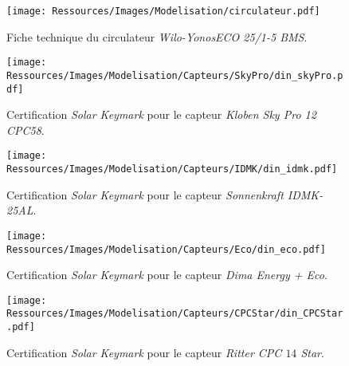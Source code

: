 
\begin{figure}
    \centering
    \texttt{[image: Ressources/Images/Modelisation/circulateur.pdf]}
    \caption{Fiche technique du circulateur \textit{Wilo-YonosECO 25/1-5 BMS}.
             \label{fig:caracs_pompes}}
\end{figure}


\begin{figure}
    \centering
    \texttt{[image: Ressources/Images/Modelisation/Capteurs/SkyPro/din\_skyPro.pdf]}
    \caption{Certification \textit{Solar Keymark} pour le capteur \textit{Kloben Sky Pro 12 CPC58}.
             \label{fig:caracs_skypro}}
\end{figure}


\begin{figure}
    \centering
    \texttt{[image: Ressources/Images/Modelisation/Capteurs/IDMK/din\_idmk.pdf]}
    \caption{Certification \textit{Solar Keymark} pour le capteur \textit{Sonnenkraft IDMK-25AL}.
             \label{fig:caracs_idmk}}
\end{figure}


\begin{figure}
    \centering
    \texttt{[image: Ressources/Images/Modelisation/Capteurs/Eco/din\_eco.pdf]}
    \caption{Certification \textit{Solar Keymark} pour le capteur \textit{Dima Energy + Eco}.
             \label{fig:caracs_eco}}
\end{figure}


\begin{figure}
    \centering
    \texttt{[image: Ressources/Images/Modelisation/Capteurs/CPCStar/din\_CPCStar.pdf]}
    \caption{Certification \textit{Solar Keymark} pour le capteur \textit{Ritter CPC $14$ Star}.
             \label{fig:caracs_star}}
\end{figure}
